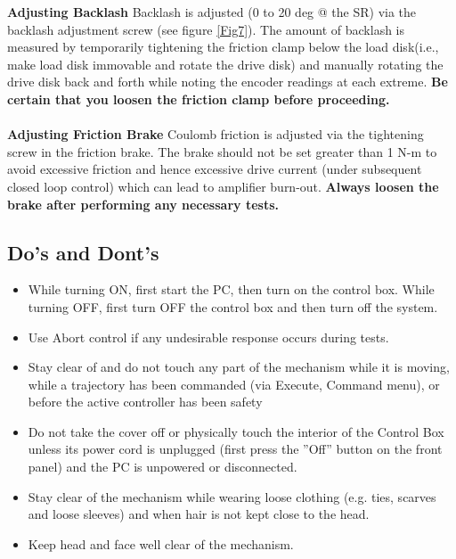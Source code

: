 \documentclass[11pt, a4paper]{article}
\begin{document}
\textbf{Adjusting Backlash} Backlash is adjusted (0 to 20 deg @ the SR) via the backlash adjustment screw (see figure \ref{Fig7}). The amount of backlash is measured by temporarily tightening the friction clamp below the load disk(i.e., make load disk immovable and rotate the drive disk) and manually rotating the drive disk back and forth while noting the encoder readings at each extreme. \textbf{Be certain that you loosen the friction clamp before proceeding.} \\ \\ 
\textbf{Adjusting Friction Brake} Coulomb friction is adjusted via the tightening screw in the friction brake. The brake should not be set greater than 1 N-m to avoid excessive friction and hence excessive drive current (under subsequent closed loop control) which can lead to amplifier burn-out. \textbf{Always loosen the brake after performing any necessary tests.}
\subsection{Do's and Dont's}
\begin{itemize}
\item While turning ON, first start the PC, then turn on the control box. While turning OFF, first turn OFF the control box and then turn off the system.
\item Use Abort control if any undesirable response occurs during tests.
\item Stay clear of and do not touch any part of the mechanism while it is moving, while a trajectory has been commanded (via Execute, Command menu), or before the active controller has been safety
\item Do not take the cover off or physically touch the interior of the Control Box unless its power cord is unplugged (first press the ”Off” button on the front panel) and the PC is unpowered or disconnected.
\item Stay clear of the mechanism while wearing loose clothing (e.g. ties, scarves and loose sleeves) and when hair is not kept close to the head.
\item Keep head and face well clear of the mechanism.
\end{itemize}
\end{document}
